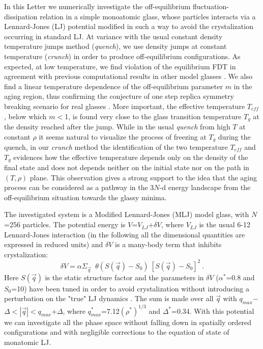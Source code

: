 In this Letter we numerically investigate the off-equilibrium
fluctuation-dissipation relation in a simple monoatomic glass,
whose particles interacts via a Lennard-Jones (LJ) potential
modified in such a way to avoid the crystalization occurring
in standard LJ. At variance with the usual constant density temperature
jumps method ({\it quench}), we use density jumps at constant temperature
({\it crunch}) in order to produce off-equilibrium configurations.
As expected, at low temperature, we find violation of the equilibrium FDT
in agreement with previous computational results in other model glasses
\cite{PABA}. We also find a linear temperature dependence of the
off-equilibrium parameter $m$ in the aging region, thus confirming the
conjecture of one step replica symmetry breaking scenario for real glasses
\cite{equiv}. More important, the effective temperature $T_{\!e\!f\!\!f}$,
below which $m$$<$1, is found very close to the glass transition temperature
$T_g$ at the density reached after the jump. While in the usual {\it quench}
from high $T$ at constant $\rho$ it seems natural to visualize the
process of freezing at $T_g$ during the quench, in our {\it crunch} method
the identification of the two temperature $T_{\!e\!f\!\!f}$ and $T_g$
evidences how the effective temperature depends only on the density of
the final state and does not depends neither on the initial state nor on
the path in $(T,\rho)$ plane. This observation gives a strong support to
the idea that the aging process can be considered as a pathway
in the 3$N$-d energy landscape from the off-equilibrium situation towards
the glassy minima\cite{bho}.

The investigated system is a Modified Lennard-Jones (MLJ) model glass,
with $N$=256 particles. The potential energy is $V$=$V_{LJ}$+$\delta V$,
where $V_{LJ}$ is the usual 6-12 Lennard-Jones interaction
(in the following all the dimensional quantities are expressed in
reduced units) and $\delta V$ is a many-body term that inhibits crystalization:
\begin{equation}
\delta V = \alpha \Sigma_{\vec q}  \; \;
\theta ( S({\vec q}) - S_0 ) \
\left [ S({\vec q}) - S_0 \right ]^2 \ .
\end{equation}
Here $S({\vec q})$ is the static structure factor and the
parameters in $\delta V$ ($\alpha^*$=0.8 and $S_0$=10) have been
tuned in order to avoid crystalization without
introducing a perturbation on the "true" LJ dynamics \cite{ADPR}.
The sum is made over all $\vec q$ with
$q_{max}$$-$$\Delta$$<$$|{\vec q}|$$<$$q_{max}$+$\Delta$, where
$q^*_{max}$=7.12$(\rho^*)^{1/3}$ and $\Delta^*$=0.34.
With this potential we can investigate all the phase space
without falling down in spatially ordered configurations
and with negligible corrections to the equation of state of monatomic LJ.

